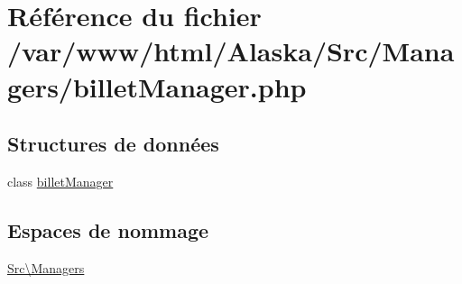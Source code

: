 \hypertarget{billet_manager_8php}{}\section{Référence du fichier /var/www/html/\+Alaska/\+Src/\+Managers/billet\+Manager.php}
\label{billet_manager_8php}
\subsection*{Structures de données}
\begin{DoxyCompactItemize}
\item 
class \hyperlink{class_src_1_1_managers_1_1billet_manager}{billet\+Manager}
\end{DoxyCompactItemize}
\subsection*{Espaces de nommage}
\begin{DoxyCompactItemize}
\item 
 \hyperlink{namespace_src_1_1_managers}{Src\textbackslash{}\+Managers}
\end{DoxyCompactItemize}
